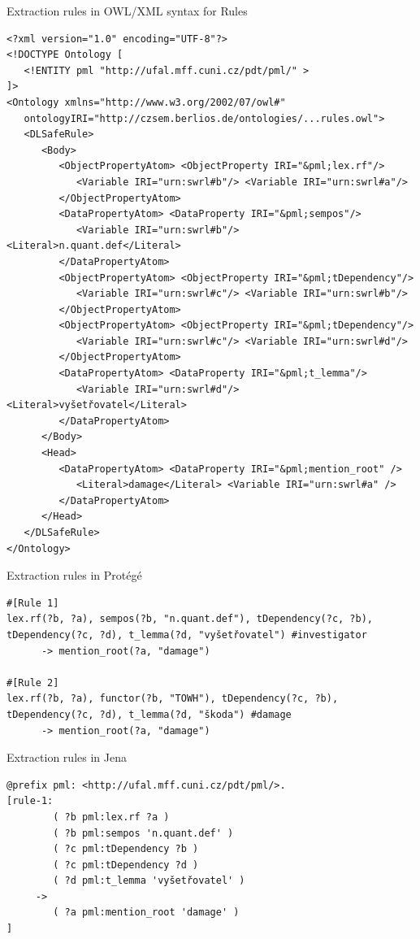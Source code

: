 \documentclass[xcolor=dvipsnames]{beamer}
\begin{document}
\begin{frame}[fragile]{Extraction rules in OWL/XML syntax for Rules}
\begin{verbatim}
<?xml version="1.0" encoding="UTF-8"?>
<!DOCTYPE Ontology [
   <!ENTITY pml "http://ufal.mff.cuni.cz/pdt/pml/" >
]>
<Ontology xmlns="http://www.w3.org/2002/07/owl#"
   ontologyIRI="http://czsem.berlios.de/ontologies/...rules.owl">
   <DLSafeRule>
      <Body>
         <ObjectPropertyAtom> <ObjectProperty IRI="&pml;lex.rf"/>
            <Variable IRI="urn:swrl#b"/> <Variable IRI="urn:swrl#a"/>
         </ObjectPropertyAtom>
         <DataPropertyAtom> <DataProperty IRI="&pml;sempos"/>
            <Variable IRI="urn:swrl#b"/> <Literal>n.quant.def</Literal>
         </DataPropertyAtom>
         <ObjectPropertyAtom> <ObjectProperty IRI="&pml;tDependency"/>
            <Variable IRI="urn:swrl#c"/> <Variable IRI="urn:swrl#b"/>
         </ObjectPropertyAtom>
         <ObjectPropertyAtom> <ObjectProperty IRI="&pml;tDependency"/>
            <Variable IRI="urn:swrl#c"/> <Variable IRI="urn:swrl#d"/>
         </ObjectPropertyAtom>
         <DataPropertyAtom> <DataProperty IRI="&pml;t_lemma"/>
            <Variable IRI="urn:swrl#d"/> <Literal>vyšetřovatel</Literal>
         </DataPropertyAtom>
      </Body>
      <Head>
         <DataPropertyAtom> <DataProperty IRI="&pml;mention_root" />
            <Literal>damage</Literal> <Variable IRI="urn:swrl#a" />
         </DataPropertyAtom>
      </Head>
   </DLSafeRule>
</Ontology>
\end{verbatim}
\end{frame}

\begin{frame}[fragile]{Extraction rules in Prot\'{e}g\'{e}}
\begin{verbatim}
#[Rule 1]
lex.rf(?b, ?a), sempos(?b, "n.quant.def"), tDependency(?c, ?b),
tDependency(?c, ?d), t_lemma(?d, "vyšetřovatel") #investigator
      -> mention_root(?a, "damage")

#[Rule 2]
lex.rf(?b, ?a), functor(?b, "TOWH"), tDependency(?c, ?b),
tDependency(?c, ?d), t_lemma(?d, "škoda") #damage
      -> mention_root(?a, "damage")
\end{verbatim}
\end{frame}

\begin{frame}[fragile]{Extraction rules in Jena}
\begin{verbatim}
@prefix pml: <http://ufal.mff.cuni.cz/pdt/pml/>.
[rule-1:  
        ( ?b pml:lex.rf ?a )
        ( ?b pml:sempos 'n.quant.def' )
        ( ?c pml:tDependency ?b )
        ( ?c pml:tDependency ?d )
        ( ?d pml:t_lemma 'vyšetřovatel' )
     -> 
        ( ?a pml:mention_root 'damage' )
]
\end{verbatim}
\end{frame}
\end{document}
